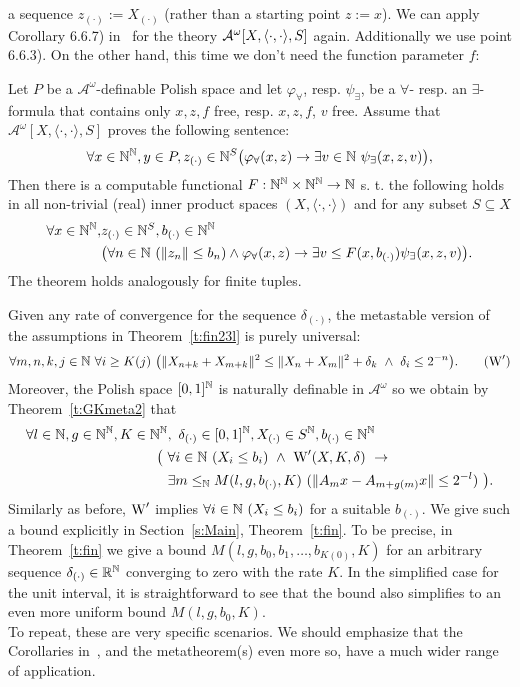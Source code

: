 a sequence $z_{(\cdot)}:=X_{(\cdot)}$ (rather than a starting point $z:=x$). 
We can apply Corollary 6.6.7) in~\cite{GK08} for the theory $\mathcal{A}^\omega[X,\langle\cdot,\cdot\rangle,S]$ again. 
Additionally we use point 6.6.3). On the other hand,
this time we don't need the function parameter $f$:
\begin{thm}\label{t:GKmeta2}
Let $P$ be a $\mathcal{A}^\omega$-definable Polish space and let $\varphi_\forall$, resp. $\psi_\exists$, be a $\forall$-
resp. an $\exists$-formula that contains only $x,z,f$ free, resp. $x,z,f$, $v$ free. Assume that
$\mathcal{A}^\omega[X,\langle\cdot,\cdot\rangle,S]$ proves the following sentence:
\[
\forall  x\in\NN^\NN, y\in P,z_{(\cdot)}\in\NN^S 
	\big( \varphi_\forall(x, z)\rightarrow\exists v\in\NN\ \psi_\exists(x, z, v)\big),
\]
Then there is a computable functional $F : \mathbb{N}^{\mathbb{N}}\times \mathbb{N}^{\mathbb{N}}\to \mathbb{N}$ s. t. the following holds
in all non-trivial (real) inner product spaces $(X,\langle\cdot,\cdot\rangle)$ and for any subset $S\subseteq X$
\begin{align*}
\forall  x\in\mathbb{N}^{\mathbb{N}}, &z_{(\cdot)}\in\mathbb{N}^S, b_{(\cdot)}\in\mathbb{N}^{\mathbb{N}} \\
	&\big( \forall n\in\mathbb{N}\ ( \|z_n\|\leq b_n)\wedge\varphi_\forall(x, z) \rightarrow
	\exists v\leq F(x,b_{(\cdot)})\psi_\exists(x, z, v)\big).
\end{align*}
The theorem holds analogously for finite tuples.
\end{thm}
Given any rate of convergence for the sequence $\delta_{(\cdot)}$, the metastable version of the assumptions 
in Theorem~\ref{t:fin23l} is purely universal:
\begin{align*}
\forall m,n,k,j\in\NN\ \forall i\geq K(j) 
 \ \big( \|X_{n+k}+X_{m+k}\|^2 \leq \|X_{n}+X_{m}\|^2 + \delta_k\ \wedge\ \delta_i\leq 2^{-n} \big). \tag{$\TAN'$}
\end{align*}
Moreover, the Polish space $[0,1]^{\mathbb{N}}$ is naturally definable in $\mathcal{A}^\omega$ so we obtain
by Theorem~\ref{t:GKmeta2} that
\begin{align*}
\forall l\in\NN,g\in\NN^\NN,K\in\NN^\NN&,\ \delta_{(\cdot)}\in[0,1]^\NN, X_{(\cdot)}\in S^\NN, b_{(\cdot)}\in\NN^\NN\\ 
  \big(\ &\forall i\in\NN\ ( X_i\leq b_i)\ \wedge\ \TAN'(X,K,\delta)\ \rightarrow \\
	      &\exists m\leq_\NN M(l,g,b_{(\cdot)},K)\ ( \|A_mx-A_{m+g(m)}x\|\leq 2^{-l}) \ \big).
\end{align*}
Similarly as before, $\operatorname{W}'$ implies $\forall i\in\mathbb{N}\ ( X_i\leq b_i)$ for a suitable $b_{(\cdot)}$.
We give such a bound explicitly in Section~\ref{s:Main}, Theorem~\ref{t:fin}. To be precise,
in Theorem~\ref{t:fin} we give a bound $M(l,g, b_0, b_1, \ldots, b_{K(0)},K)$ for 
an arbitrary sequence $\delta_{(\cdot)}\in\mathbb{R}^{\mathbb{N}}$ converging to zero with the rate $K$. In the simplified case for 
the unit interval, it is straightforward to see that the bound also
simplifies to an even more uniform bound $M(l,g,b_0,K)$.\\
To repeat, these are very specific scenarios. We should emphasize that the 
Corollaries in~\cite{GK08}, and 
the metatheorem(s) even more so, have a much wider range of application.
